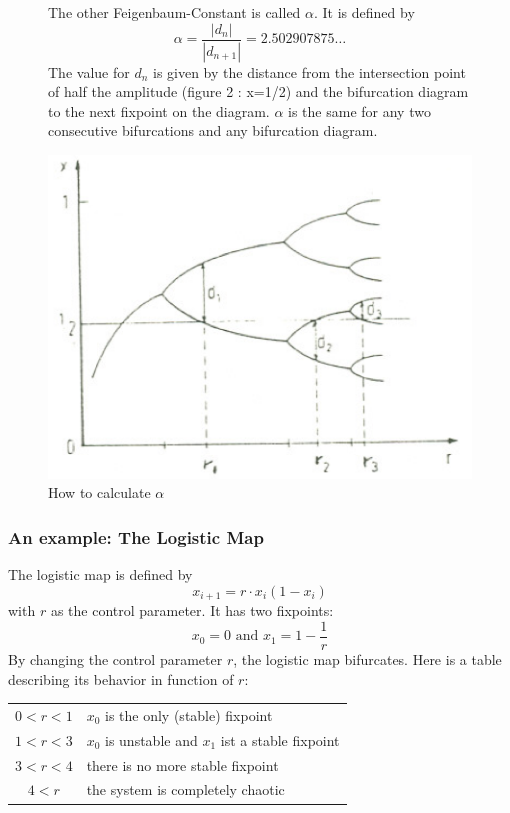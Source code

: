 \begin{figure}[H]
\begin{minipage}{0.4\textwidth}
The other Feigenbaum-Constant is called $\alpha$. It is defined by \begin{equation} \alpha = \frac{|d_n|}{|d_{n+1}|}=2.502907875\dots\end{equation} The value for $d_n$ is given by the distance from the intersection point of half the amplitude (figure 2 : x=1/2) and the bifurcation diagram to the next fixpoint on the diagram. $\alpha$ is the same for any two consecutive bifurcations and any bifurcation diagram.
\end{minipage}
\begin{minipage}{0.6\textwidth}
\includegraphics[width=\textwidth]{Bilder/alpha.png}
\caption{How to calculate $\alpha$}
\end{minipage}
\end{figure}

\subsubsection{An example: The Logistic Map}

The logistic map is defined by $$x_{i+1}=r\cdot x_i(1-x_i)$$ with $r$ as the control parameter. It has two fixpoints: $$x_0 = 0 \text{\ and \ } x_1 = 1-\frac{1}{r}$$ By changing the control parameter $r$, the logistic map bifurcates. Here is a table describing its behavior in function of $r$:\\

\begin{tabular}{c l}
$0 < r < 1$ & $x_0$ is the only (stable) fixpoint\\
$1 < r < 3$ & $x_0$ is unstable and $x_1$ ist a stable fixpoint\\
$3 < r < 4$ & there is no more stable fixpoint\\
$4 < r$ & the system is completely chaotic
\end{tabular}

